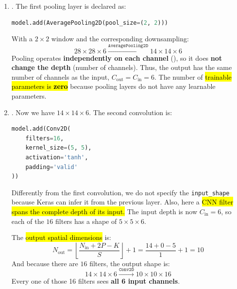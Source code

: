 \begin{enumerate}
    Instead, how many \hl{trainable parameters} does this layer have? Using the \autoref{eq:number-of-trainable-parameters-for-n-filters} (), we have:
    \begin{align*}
        \text{\# trainable parameters} &= C_{\text{out}} \left( K_h K_w C_{\text{in}} + 1 \right) \\
        &= 6 \left( 5 \cdot 5 \cdot 1 + 1 \right) \\
        &= 6 \left( 25 + 1 \right) \\
        &= 6 \cdot 26 \\
        &= 156
    \end{align*}


    \item {}. The first pooling layer is declared as:
    \begin{lstlisting}[language=Python]
model.add(AveragePooling2D(pool_size=(2, 2)))
\end{lstlisting}
    With a $2 \times 2$ window and the corresponding downsampling:
    \begin{equation*}
        28 \times 28 \times 6 \xrightarrow{\texttt{AveragePooling2D}} 14 \times 14 \times 6
    \end{equation*}
    Pooling operates \textbf{independently on each channel} (), so it does \textbf{not change the depth} (number of channels). Thus, the output has the same number of channels as the input, $C_{\text{out}} = C_{\text{in}} = 6$. The number of \hl{trainable parameters is \textbf{zero}} because pooling layers do not have any learnable parameters.


    \item {}. Now we have $14 \times 14 \times 6$. The second convolution is:
    \begin{lstlisting}[language=Python]
model.add(Conv2D(
    filters=16,
    kernel_size=(5, 5),
    activation='tanh',
    padding='valid'
))
\end{lstlisting}
    Differently from the first convolution, we do not specify the \texttt{input\_shape} because Keras can infer it from the previous layer. Also, here a \hl{CNN filter spans the complete depth of its input.} The input depth is now $C_{\text{in}} = 6$, so each of the $16$ filters has a shape of $5 \times 5 \times 6$.

    \highspace
    The \hl{output spatial dimensions} is:
    \begin{equation*}
        N_{\text{out}} = \left\lfloor \frac{N_{\text{in}} + 2P - K}{S} \right\rfloor + 1 = \frac{14 + 0 - 5}{1} + 1 = 10
    \end{equation*}
    And because there are $16$ filters, the output shape is:
    \begin{equation*}
        14 \times 14 \times 6 \xrightarrow{\texttt{Conv2D}} 10 \times 10 \times 16
    \end{equation*}
    Every one of those 16 filters sees \textbf{all 6 input channels}.


\end{enumerate}
